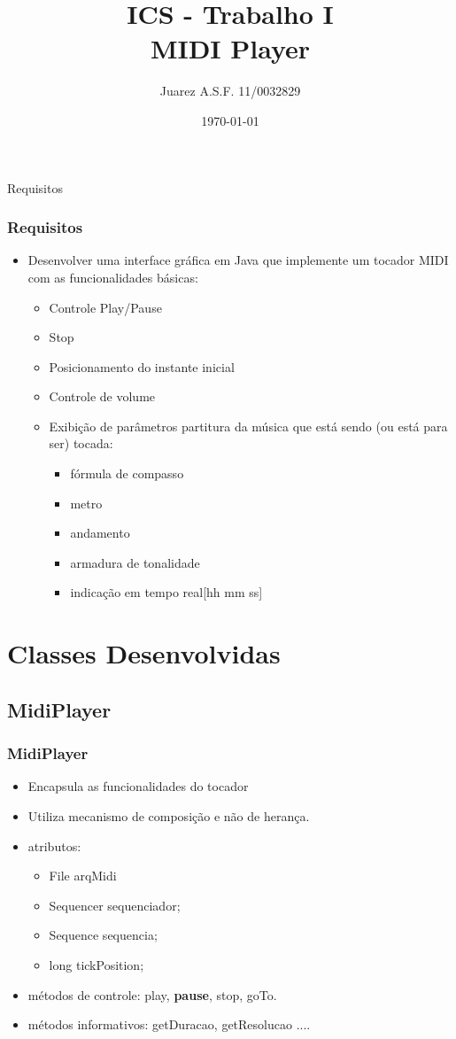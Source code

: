 \documentclass{beamer}
\title[Introdução a Computação Sônica]{ ICS - Trabalho I \\ MIDI Player}
\author{Juarez A.S.F. 11/0032829}
\institute{Universidade de Brasília}
\date{\today}
\begin{document}
\begin{frame}
        \titlepage
\end{frame}


\begin{frame}{Requisitos}
	\frametitle{Requisitos}
    \begin{itemize}
	\item Desenvolver uma interface gráfica em Java que implemente um tocador MIDI com as funcionalidades básicas:
	\begin{itemize}
	 \item Controle Play/Pause
	 \item Stop
	 \item Posicionamento do instante inicial
	 \item Controle de volume
	 \item Exibição de parâmetros partitura da música que está sendo (ou está para ser) tocada: 
	    \begin{itemize}
	     \item fórmula de compasso
	     \item metro
	     \item andamento
	     \item armadura de tonalidade
	     \item indicação em tempo real[hh mm ss]
	    \end{itemize}
	\end{itemize}
    \end{itemize}
\end{frame}

\section{Classes Desenvolvidas}
\subsection{MidiPlayer}
\begin{frame}
	\frametitle{MidiPlayer}
	\begin{itemize}
		\item Encapsula as funcionalidades do tocador
		\item Utiliza mecanismo de composição e não de herança.
		\item atributos:
		\begin{itemize}
			\item File arqMidi
			\item Sequencer sequenciador;
			\item Sequence  sequencia;
			\item long tickPosition;
		\end{itemize}
		\item métodos de controle: play, \textbf{pause}, stop, goTo.
		\item métodos informativos: getDuracao, getResolucao ....
	\end{itemize}
\end{frame}
\end{document}
